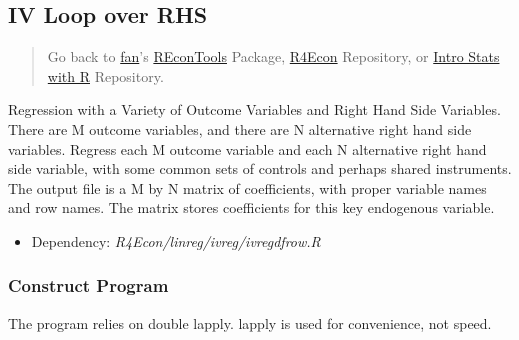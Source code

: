 \documentclass[
]{book}
\providecommand{\tightlist}{%
  \setlength{\itemsep}{0pt}\setlength{\parskip}{0pt}}
\begin{document}
\hypertarget{iv-loop-over-rhs}{%
\subsection{IV Loop over RHS}\label{iv-loop-over-rhs}}

\begin{quote}
Go back to \href{http://fanwangecon.github.io/CodeDynaAsset/}{fan}'s \href{https://fanwangecon.github.io/REconTools/}{REconTools} Package, \href{https://fanwangecon.github.io/R4Econ/}{R4Econ} Repository, or \href{https://fanwangecon.github.io/Stat4Econ/}{Intro Stats with R} Repository.
\end{quote}

Regression with a Variety of Outcome Variables and Right Hand Side Variables. There are M outcome variables, and there are N alternative right hand side variables. Regress each M outcome variable and each N alternative right hand side variable, with some common sets of controls and perhaps shared instruments. The output file is a M by N matrix of coefficients, with proper variable names and row names. The matrix stores coefficients for this key endogenous variable.

\begin{itemize}
\tightlist
\item
  Dependency: \emph{R4Econ/linreg/ivreg/ivregdfrow.R}
\end{itemize}

\hypertarget{construct-program-1}{%
\subsubsection{Construct Program}\label{construct-program-1}}

The program relies on double lapply. lapply is used for convenience, not speed.
\end{document}
